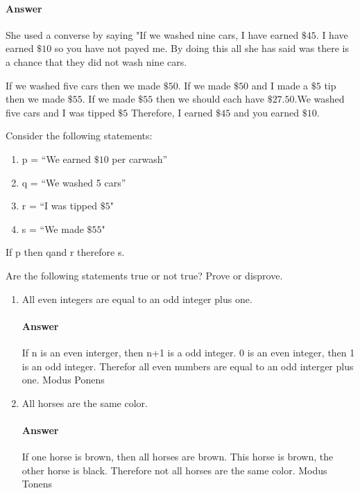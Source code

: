 \documentclass{article}
\begin{document}
\paragraph{Answer}

She used a converse by saying "If we washed nine cars, I have earned $\$45$. I have earned $\$10$ so you have not payed me. By doing this all she has said was there is a chance that they did not wash nine cars.

If we washed five cars then we made $\$50$. If we made $\$50$ and I made a $\$5$ tip then we made $\$55$. If we made $\$55$ then we should each have $\$27.50$.We washed five cars and I was tipped $\$5$
Therefore, I earned $\$45$ and you earned $\$10$.

Consider the following statements:
\begin{enumerate}
    \item p = ``We earned $\$10$ per carwash''
    \item q = ``We washed 5 cars''
    \item r = ``I was tipped $\$5$"
	\item s = ``We made $\$55$"
\end{enumerate}
If p then qand r therefore s.



Are the following statements true or not true?    Prove or disprove.

\begin{enumerate}

    \item All even integers are equal to an odd integer plus one.

        \paragraph{Answer}
        If n is an even interger, then n+1 is a odd integer.
	   0 is an even integer, then 1 is an odd integer.
	   Therefor all even numbers are equal to an odd interger plus one.
	   Modus Ponens

    \item All horses are the same color.

        \paragraph{Answer}
        If one horse is brown, then all horses are brown. This horse is brown, the other horse is black. Therefore not all horses are the same color. Modus Tonens

\end{enumerate}
\end{document}
